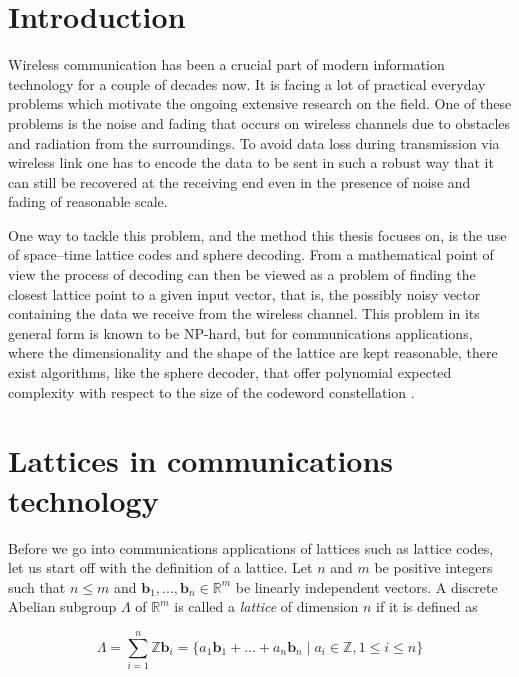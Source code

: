 \documentclass[english,12pt,a4paper,pdftex,sci,utf8]{aaltothesis}
\begin{document}
\section{Introduction}
Wireless communication has been a crucial part of modern information technology for a couple of decades now. It is facing a lot of practical everyday problems which motivate the ongoing extensive research on the field. One of these problems is the noise and fading that occurs on wireless channels due to obstacles and radiation from the surroundings. To avoid data loss during transmission via wireless link one has to encode the data to be sent in such a robust way that it can still be recovered at the receiving end even in the presence of noise and fading of reasonable scale. 
\par One way to tackle this problem, and the method this thesis focuses on, is the use of space--time lattice codes and sphere decoding. From a mathematical point of view the process of decoding can then be viewed as a problem of finding the closest lattice point to a given input vector, that is, the possibly noisy vector containing the data we receive from the wireless channel. This problem in its general form is known to be NP-hard, but for communications applications, where the dimensionality and the shape of the lattice are kept reasonable, there exist algorithms, like the sphere decoder, that offer polynomial expected complexity with respect to the size of the codeword constellation \cite{mia}.


\clearpage

\section{Lattices in communications technology}

Before we go into communications applications of lattices such as lattice codes, let us start off with the definition of a lattice. Let $n$ and $m$ be positive integers such that $n \leq m$ and $\mathbf{b}_1, ... , \mathbf{b}_n \in \mathbb{R}^m$ be linearly independent vectors. A discrete Abelian subgroup $\Lambda$ of $\mathbb{R}^m$ is called a \emph{lattice} of dimension $n$ if it is defined as

\begin{equation}
\Lambda = \sum_{i=1}^{n} \mathbb{Z}\mathbf{b}_i = \{a_1\mathbf{b}_1 + \ldots + a_n\mathbf{b}_n \mid a_i \in \mathbb{Z}, 1 \leq i \leq n\}\label{eq:lattice}
\end{equation}
\end{document}
